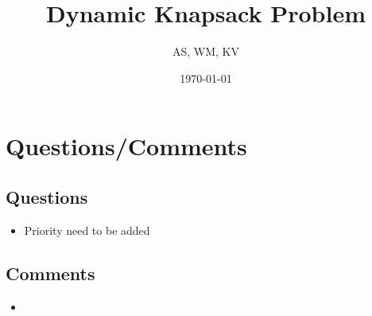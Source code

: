 \documentclass{article}
\title{Dynamic Knapsack Problem}
\author{AS, WM, KV}
\date{\today}
\begin{document}
\maketitle
\tableofcontents
\newpage


\section{Questions/Comments}

\subsection{Questions}
\begin{itemize}
	\item Priority need to be added
\end{itemize}

\subsection{Comments}
\begin{itemize}
	\item
\end{itemize}
\end{document}
